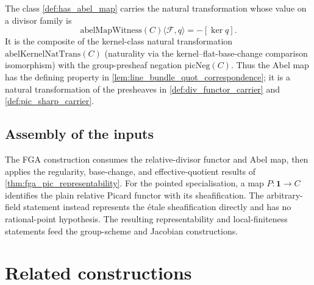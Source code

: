 The class \cref{def:has_abel_map} carries the natural transformation whose
value on a divisor family is
\[
  \mathrm{abelMapWitness}(C)\langle\mathcal F,q\rangle=-[\ker q].
\]
It is the composite of the kernel-class natural transformation
\(\mathrm{abelKernelNatTrans}(C)\) (naturality via the kernel--flat-base-change
comparison isomorphism) with the group-presheaf negation
\(\mathrm{picNeg}(C)\). Thus the Abel map has the defining property in
\cref{lem:line_bundle_quot_correspondence}; it is a natural transformation
of the presheaves in \cref{def:div_functor_carrier} and
\cref{def:pic_sharp_carrier}.

\subsection{Assembly of the inputs}
\label{subsec:fga_pic_closure_order_summary}

The FGA construction consumes the relative-divisor functor and Abel map,
then applies the regularity, base-change, and effective-quotient results of
\cref{thm:fga_pic_representability}. For the pointed specialisation, a map
\(P:\mathbf 1\to C\) identifies the plain relative Picard functor with its
sheafification. The arbitrary-field statement instead represents the \'etale
sheafification directly and has no rational-point hypothesis. The resulting
representability and local-finiteness statements feed the group-scheme and
Jacobian constructions.

\section{Related constructions}
\label{sec:fga_pic_out_of_scope}

